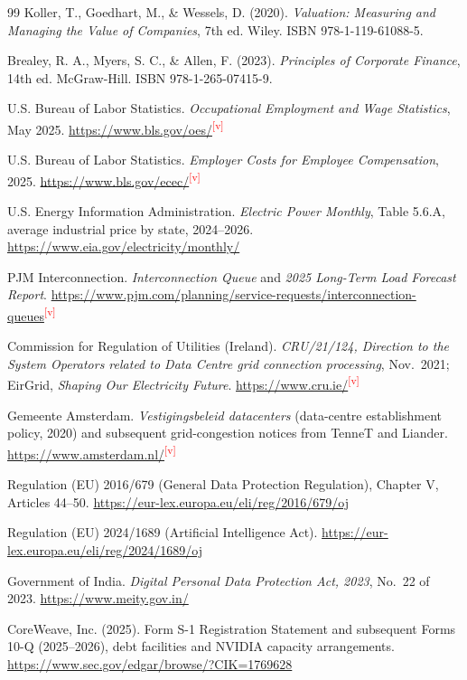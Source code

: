 \documentclass[11pt,letterpaper]{article}
\newcommand{\verify}{\textsuperscript{\textcolor{red}{[v]}}}
\begin{document}
\begin{thebibliography}{99}
Koller, T., Goedhart, M., \& Wessels, D. (2020). \textit{Valuation: Measuring and Managing the Value of Companies}, 7th ed. Wiley. ISBN 978-1-119-61088-5.

Brealey, R. A., Myers, S. C., \& Allen, F. (2023). \textit{Principles of Corporate Finance}, 14th ed. McGraw-Hill. ISBN 978-1-265-07415-9.

U.S. Bureau of Labor Statistics. \textit{Occupational Employment and Wage Statistics}, May 2025. \url{https://www.bls.gov/oes/}\verify

U.S. Bureau of Labor Statistics. \textit{Employer Costs for Employee Compensation}, 2025. \url{https://www.bls.gov/ecec/}\verify

U.S. Energy Information Administration. \textit{Electric Power Monthly}, Table 5.6.A, average industrial price by state, 2024--2026. \url{https://www.eia.gov/electricity/monthly/}

PJM Interconnection. \textit{Interconnection Queue} and \textit{2025 Long-Term Load Forecast Report}. \url{https://www.pjm.com/planning/service-requests/interconnection-queues}\verify

Commission for Regulation of Utilities (Ireland). \textit{CRU/21/124, Direction to the System Operators related to Data Centre grid connection processing}, Nov.~2021; EirGrid, \textit{Shaping Our Electricity Future}. \url{https://www.cru.ie/}\verify

Gemeente Amsterdam. \textit{Vestigingsbeleid datacenters} (data-centre establishment policy, 2020) and subsequent grid-congestion notices from TenneT and Liander. \url{https://www.amsterdam.nl/}\verify

Regulation (EU) 2016/679 (General Data Protection Regulation), Chapter V, Articles 44--50. \url{https://eur-lex.europa.eu/eli/reg/2016/679/oj}

Regulation (EU) 2024/1689 (Artificial Intelligence Act). \url{https://eur-lex.europa.eu/eli/reg/2024/1689/oj}

Government of India. \textit{Digital Personal Data Protection Act, 2023}, No.~22 of 2023. \url{https://www.meity.gov.in/}

CoreWeave, Inc. (2025). Form S-1 Registration Statement and subsequent Forms 10-Q (2025--2026), debt facilities and NVIDIA capacity arrangements. \url{https://www.sec.gov/edgar/browse/?CIK=1769628}


\end{thebibliography}
\end{document}
